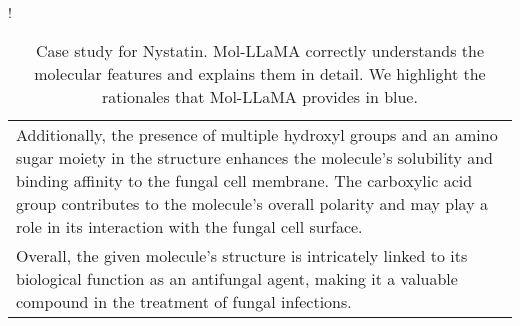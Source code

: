 \begin{table*}[ht!]
\begin{resizebox}{\linewidth}{!}
{\begin{tabular}{l c}
\multicolumn{2}{p{22cm}}{Additionally, the presence of multiple hydroxyl groups and an amino sugar moiety in the structure enhances the molecule's solubility and binding affinity to the fungal cell membrane. The carboxylic acid group contributes to the molecule's overall polarity and may play a role in its interaction with the fungal cell surface.}\\

\multicolumn{2}{p{22cm}}{Overall, the given molecule's structure is intricately linked to its biological function as an antifungal agent, making it a valuable compound in the treatment of fungal infections.}\\
\bottomrule
\end{tabular}}
\end{resizebox}
\vspace{-0.1in}
\caption{Case study for Nystatin. Mol-LLaMA correctly understands the molecular features and explains them in detail. We highlight the rationales that Mol-LLaMA provides in \textcolor{tabblue}{blue}.}
\label{app:tab:additional_qualitative_nystatin}
\end{table*}